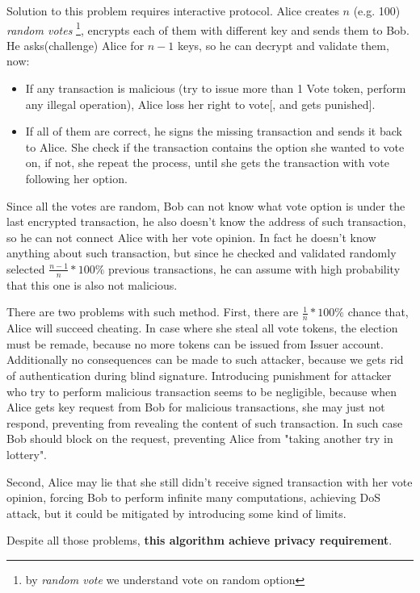\documentclass[runningheads]{llncs}
\begin{document}
Solution to this problem requires interactive protocol.
Alice creates \(n\) (e.g. 100) \textit{random votes} \footnote{by \textit{random vote} we understand vote on random option}, encrypts each of them with different key and sends them to Bob. He asks(challenge) Alice for \(n-1\) keys, so he can decrypt and validate them, now: 
\begin{itemize}
 \item If any transaction is malicious (try to issue more than 1 Vote token, perform any illegal operation), Alice loss her right to vote[, and gets punished].

 \item If all of them are correct, he signs the missing transaction and sends it back to Alice. She check if the transaction contains the option she wanted to vote on, if not, she repeat the process, until she gets the transaction with vote following her option.
\end{itemize}
Since all the votes are random, Bob can not know what vote option is under the last encrypted transaction, he also doesn't know the address of such transaction, so he can not connect Alice with her vote opinion. In fact he doesn't know anything about such transaction, but since he checked and validated randomly selected \(\frac{n-1}{n}*100\%\) previous transactions, he can assume with high probability that this one is also not malicious.

There are two problems with such method.
First, there are \(\frac{1}{n}*100\%\) chance that, Alice will succeed cheating. In case where she steal all vote tokens, the election must be remade, because no more tokens can be issued from Issuer account. Additionally no consequences can be made to such attacker, because we gets rid of authentication during blind signature. Introducing punishment for attacker who try to perform malicious transaction seems to be negligible, because when Alice gets key request from Bob for malicious transactions, she may just not respond, preventing from revealing the content of such transaction. In such case Bob should block on the request, preventing Alice from "taking another try in lottery".

Second, Alice may lie that she still didn't receive signed transaction with her vote opinion, forcing Bob to perform infinite many computations, achieving DoS attack, but it could be mitigated by introducing some kind of limits.

Despite all those problems, \textbf{this algorithm achieve privacy requirement}.
\end{document}
